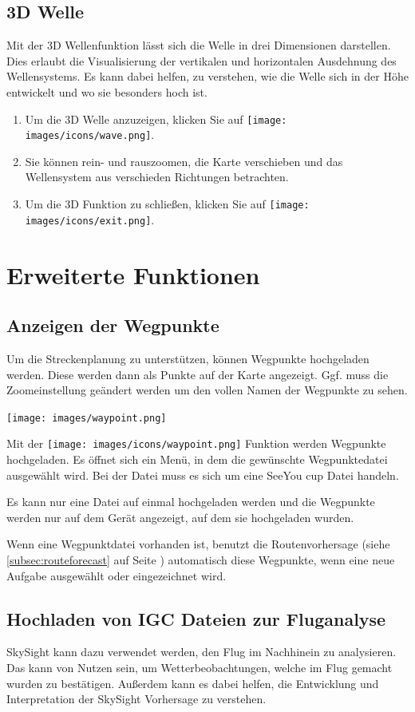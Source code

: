 \documentclass[11pt,a4paper]{article}
\begin{document}
\subsection{3D Welle}
Mit der 3D Wellenfunktion lässt sich die Welle in drei Dimensionen darstellen. Dies erlaubt die Visualisierung der vertikalen und horizontalen Ausdehnung des Wellensystems. Es kann dabei helfen, zu verstehen, wie die Welle sich in der Höhe entwickelt und wo sie besonders hoch ist.
\begin{enumerate}
\item Um die 3D Welle anzuzeigen, klicken Sie auf \texttt{[image: images/icons/wave.png]}. 
\item Sie können rein- und rauszoomen, die Karte verschieben und das Wellensystem aus verschieden Richtungen betrachten.
\item Um die 3D Funktion zu schließen, klicken Sie auf \texttt{[image: images/icons/exit.png]}.
\end{enumerate}

\section{Erweiterte Funktionen}
\subsection{Anzeigen der Wegpunkte}
Um die Streckenplanung zu unterstützen, können Wegpunkte hochgeladen werden. Diese werden dann als Punkte auf der Karte angezeigt. Ggf. muss die Zoomeinstellung geändert werden um den vollen Namen der Wegpunkte zu sehen.
\begin{center}
\texttt{[image: images/waypoint.png]}
\end{center}
Mit der \texttt{[image: images/icons/waypoint.png]} Funktion werden Wegpunkte hochgeladen. Es öffnet sich ein Menü, in dem die gewünschte Wegpunktedatei ausgewählt wird. Bei der Datei muss es sich um eine SeeYou cup Datei handeln.

Es kann nur eine Datei auf einmal hochgeladen werden und die Wegpunkte werden nur auf dem Gerät angezeigt, auf dem sie hochgeladen wurden.

Wenn eine Wegpunktdatei vorhanden ist, benutzt die Routenvorhersage (siehe \ref{subsec:routeforecast} auf Seite \pageref{subsec:routeforecast}) automatisch diese Wegpunkte, wenn eine neue Aufgabe ausgewählt oder eingezeichnet wird. 

\subsection{Hochladen von IGC Dateien zur Fluganalyse}
SkySight kann dazu verwendet werden, den Flug im Nachhinein zu analysieren. Das kann von Nutzen sein, um Wetterbeobachtungen, welche im Flug gemacht wurden zu bestätigen. Außerdem kann es dabei helfen, die Entwicklung und Interpretation der SkySight Vorhersage zu verstehen.
\end{document}
